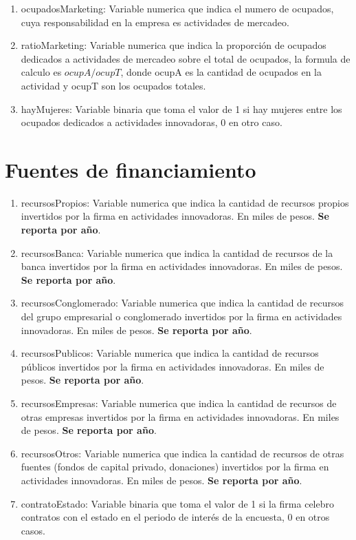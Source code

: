 \documentclass[12pt,a4paper]{article}
\begin{document}
\begin{enumerate}
	\item ocupadosMarketing: Variable numerica que indica el numero de ocupados, cuya responsabilidad en la empresa es actividades de mercadeo. 
	\item ratioMarketing: Variable numerica que indica la proporción de ocupados dedicados a actividades de mercadeo sobre el total de ocupados, la formula de calculo es $ ocupA / ocupT $, donde ocupA es la cantidad de ocupados en la actividad y ocupT son los ocupados totales.
	\item hayMujeres: Variable binaria que toma el valor de 1 si hay mujeres entre los ocupados dedicados a actividades innovadoras, 0 en otro caso.
\end{enumerate}

\section{Fuentes de financiamiento}

\begin{enumerate}
	\item recursosPropios: Variable numerica que indica la cantidad de recursos propios invertidos por la firma en actividades innovadoras. En miles de pesos. \textbf{Se reporta por año}.
	\item recursosBanca: Variable numerica que indica la cantidad de recursos de la banca invertidos por la firma en actividades innovadoras. En miles de pesos. \textbf{Se reporta por año}.
	\item recursosConglomerado: Variable numerica que indica la cantidad de recursos del grupo empresarial o conglomerado invertidos por la firma en actividades innovadoras. En miles de pesos. \textbf{Se reporta por año}.
	\item recursosPublicos: Variable numerica que indica la cantidad de recursos públicos invertidos por la firma en actividades innovadoras. En miles de pesos. \textbf{Se reporta por año}.
	\item recursosEmpresas: Variable numerica que indica la cantidad de recursos de otras empresas invertidos por la firma en actividades innovadoras. En miles de pesos. \textbf{Se reporta por año}.
	\item recursosOtros: Variable numerica que indica la cantidad de recursos de otras fuentes (fondos de capital privado, donaciones) invertidos por la firma en actividades innovadoras. En miles de pesos. \textbf{Se reporta por año}.
	\item contratoEstado: Variable binaria que toma el valor de 1 si la firma celebro contratos con el estado en el periodo de interés de la encuesta, 0 en otros casos.
\end{enumerate}
\end{document}
